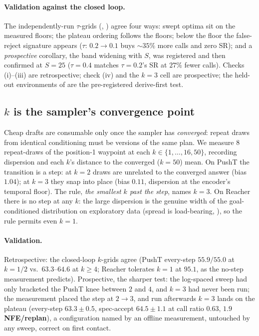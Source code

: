\documentclass{article}
\begin{document}
\paragraph{Validation against the closed loop.} The independently-run
$\tau$-grids (, ) agree four ways: swept
optima sit on the measured floors; the plateau ordering follows the floors;
below the floor the false-reject signature appears ($\tau{:}\,0.2{\to}0.1$
buys ${\sim}35\%$ more calls and zero SR); and a \emph{prospective} corollary,
the band widening with $S$, was registered and then confirmed at $S{=}25$
($\tau{=}0.4$ matches $\tau{=}0.2$'s SR at $27\%$ fewer calls). Checks
(i)--(iii) are retrospective; check (iv) and the $k{=}3$ cell are prospective;
the held-out environments of  are the
pre-registered derive-first test.

\subsection{$k$ is the sampler's convergence point}
\label{sec:calib-k}
Cheap drafts are consumable only once the sampler has \emph{converged}: repeat
draws from identical conditioning must be versions of the same plan. We measure
$8$ repeat-draws of the position-1 waypoint at each
$k\in\{1,\ldots,16,50\}$, recording dispersion and each $k$'s distance to the
converged ($k{=}50$) mean. On PushT the transition is a step: at $k{=}2$ draws
are unrelated to the converged answer (bias $1.04$); at $k{=}3$ they snap into
place (bias $0.11$, dispersion at the encoder's temporal floor). The rule,
\emph{the smallest $k$ past the step}, names $k{=}3$. On Reacher there is no
step at any $k$: the large dispersion is the genuine width of the
goal-conditioned distribution on exploratory data (spread is load-bearing,
), so the rule permits even $k{=}1$.

\paragraph{Validation.} Retrospective: the closed-loop $k$-grids agree (PushT
every-step $55.9/55.0$ at $k{=}1/2$ vs.\ $63.3$--$64.6$ at $k{\ge}4$; Reacher
tolerates $k{=}1$ at $95.1$, as the no-step measurement predicts). Prospective,
the sharper test: the log-spaced sweep had only bracketed the PushT knee
between $2$ and $4$, and $k{=}3$ had never been run; the measurement placed the
step at $2{\to}3$, and run afterwards $k{=}3$ lands on the plateau (every-step
$63.3{\pm}0.5$, spec-accept $64.5{\pm}1.1$ at call ratio $0.63$, $\mathbf{1.9}$
\textbf{NFE/replan}), a configuration named by an offline measurement,
untouched by any sweep, correct on first contact.
\end{document}
